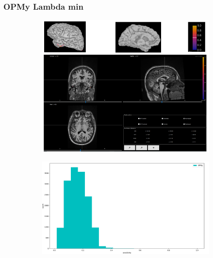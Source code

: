 \documentclass{beamer}
\numberwithin{figure}{section}
\numberwithin{equation}{section}
\begin{document}
\section{}
\begin{frame}
 \frametitle{OPMy Lambda min}
  

 	\begin{figure}[h]
        \begin{subfigure}[h]{0.53\linewidth} 
            \includegraphics[width=\linewidth]{pictures/OPMY3}
            \label{fig:rdf_graph}
        \end{subfigure}       
        \begin{subfigure}[h]{0.45\linewidth} 
            \includegraphics[width=\linewidth]{pictures/HISTopmy2}
            \label{fig:rdfs_graph}
        \end{subfigure}
    \end{figure}

  
\end{frame}
\end{document}
